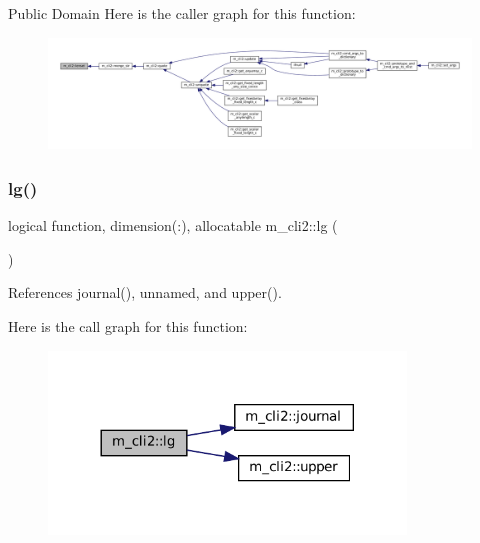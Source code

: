 Public Domain Here is the caller graph for this function\+:\nopagebreak
\begin{figure}[H]
\begin{center}
\leavevmode
\includegraphics[width=350pt]{namespacem__cli2_ad13853611abfee00d40ffa020662ec8a_icgraph}
\end{center}
\end{figure}
\mbox{\label{namespacem__cli2_aa1653cf1d6ce9739c1dcfdcb5361fa5f}} 
\subsubsection{\texorpdfstring{lg()}{lg()}}
{\footnotesize\ttfamily logical function, dimension(\+:), allocatable m\+\_\+cli2\+::lg (\begin{DoxyParamCaption}{ }\end{DoxyParamCaption})\hspace{0.3cm}{\ttfamily [private]}}



References journal(), unnamed, and upper().

Here is the call graph for this function\+:\nopagebreak
\begin{figure}[H]
\begin{center}
\leavevmode
\includegraphics[width=269pt]{namespacem__cli2_aa1653cf1d6ce9739c1dcfdcb5361fa5f_cgraph}
\end{center}
\end{figure}
\mbox{\label{namespacem__cli2_a12c60a847f6ce11bd057e4fcc038a655}} 
